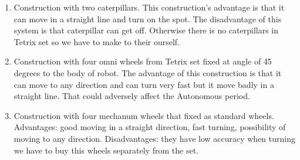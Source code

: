 \begin{enumerate}
\begin{enumerate}
\begin{enumerate}
\begin{enumerate}
	      \item Construction with two caterpillars. This construction's advantage is that it can move in a straight line and turn on the spot. The disadvantage of this system is that caterpillar can get off. Otherwise there is no caterpillars in Tetrix set so we have to make to their ourself.  
	      
	      \item Construction with four omni wheels from Tetrix set fixed at angle of 45 degrees to the body of robot. The advantage of this construction is that it can move to any direction and can turn very fast but it move badly in a straight line. That could adversely affect the Autonomous period.
	      
	      \item Construction with four mechanum wheels that fixed as standard wheels. Advantages: good moving in a straight direction, fast turning, possibility of moving to any direction. Disadvantages:  they have low accuracy when turning we have to buy this wheels separately from the set.
	      

\end{enumerate}
\end{enumerate}
\end{enumerate}
\end{enumerate}
